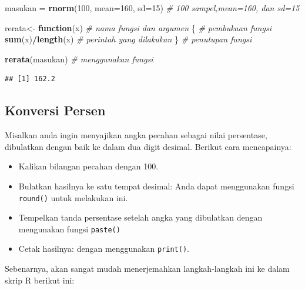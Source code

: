 \documentclass[
]{book}
\newenvironment{Shaded}{\begin{snugshade}}{\end{snugshade}}
\newcommand{\AttributeTok}[1]{\textcolor[rgb]{0.13,0.29,0.53}{#1}}
\newcommand{\CommentTok}[1]{\textcolor[rgb]{0.56,0.35,0.01}{\textit{#1}}}
\newcommand{\ControlFlowTok}[1]{\textcolor[rgb]{0.13,0.29,0.53}{\textbf{#1}}}
\newcommand{\DecValTok}[1]{\textcolor[rgb]{0.00,0.00,0.81}{#1}}
\newcommand{\FunctionTok}[1]{\textcolor[rgb]{0.13,0.29,0.53}{\textbf{#1}}}
\newcommand{\NormalTok}[1]{#1}
\newcommand{\OtherTok}[1]{\textcolor[rgb]{0.56,0.35,0.01}{#1}}
\newcommand{\SpecialCharTok}[1]{\textcolor[rgb]{0.81,0.36,0.00}{\textbf{#1}}}
\providecommand{\tightlist}{%
  \setlength{\itemsep}{0pt}\setlength{\parskip}{0pt}}
\begin{document}
\begin{Shaded}
\begin{Highlighting}[]
\NormalTok{masukan }\OtherTok{=} \FunctionTok{rnorm}\NormalTok{(}\DecValTok{100}\NormalTok{, }\AttributeTok{mean=}\DecValTok{160}\NormalTok{, }\AttributeTok{sd=}\DecValTok{15}\NormalTok{)        }\CommentTok{\# 100 sampel,mean=160, dan sd=15 }

\NormalTok{rerata}\OtherTok{\textless{}{-}} \ControlFlowTok{function}\NormalTok{(x)                         }\CommentTok{\# nama fungsi dan argumen   }
\NormalTok{\{                                            }\CommentTok{\# pembukaan fungsi}
  \FunctionTok{sum}\NormalTok{(x)}\SpecialCharTok{/}\FunctionTok{length}\NormalTok{(x)                           }\CommentTok{\# perintah yang dilakukan }
\NormalTok{\}                                            }\CommentTok{\# penutupan fungsi}

\FunctionTok{rerata}\NormalTok{(masukan)                              }\CommentTok{\# menggunakan fungsi}
\end{Highlighting}
\end{Shaded}

\begin{verbatim}
## [1] 162.2
\end{verbatim}

\hypertarget{konversi-persen}{%
\subsection{Konversi Persen}\label{konversi-persen}}

Misalkan anda ingin menyajikan angka pecahan sebagai nilai persentase, dibulatkan dengan baik ke dalam dua digit desimal. Berikut cara mencapainya:

\begin{itemize}
\tightlist
\item
  Kalikan bilangan pecahan dengan 100.
\item
  Bulatkan hasilnya ke satu tempat desimal: Anda dapat menggunakan fungsi \texttt{round()} untuk melakukan ini.
\item
  Tempelkan tanda persentase setelah angka yang dibulatkan dengan mengunakan fungsi \texttt{paste()}
\item
  Cetak hasilnya: dengan menggunakan \texttt{print()}.
\end{itemize}

Sebenarnya, akan sangat mudah menerjemahkan langkah-langkah ini ke dalam skrip R berikut ini:
\end{document}
